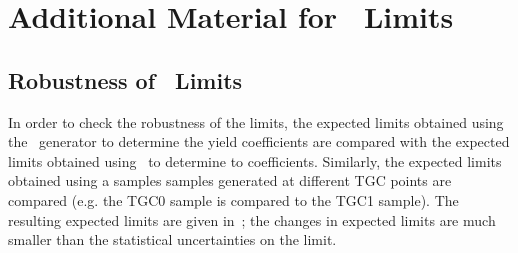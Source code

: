 \clearpage
\appendix
{}

\graphicspath{{Chapters/AppendixTGC/Figures/}}
\chapter{Additional Material for \TGC\ Limits }
\label{appendix:TGC}

\section{Robustness of \TGC\ Limits}
\label{appendix:TGC-Robustness}

In order to check the robustness of the limits, the expected limits obtained
using the \BR\ generator to determine the yield coefficients are compared with
the expected limits obtained using \BHO\ to determine to coefficients.
Similarly, the expected limits obtained using a samples samples generated at
different TGC points are compared (e.g. the TGC0 sample is compared to the TGC1
sample). The resulting expected limits are given in~; the changes in expected limits are much smaller
than the statistical uncertainties on the limit.

